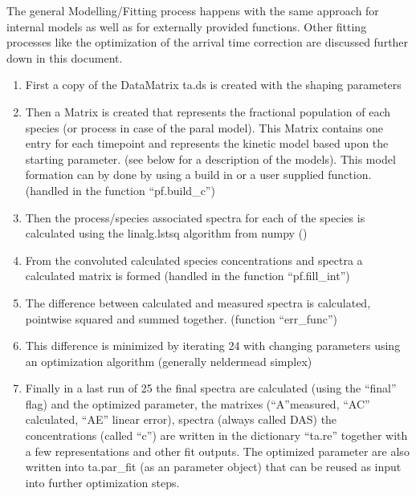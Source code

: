 \documentclass[letterpaper,10pt,english]{sphinxmanual}
\begin{document}
The general Modelling/Fitting process happens with the same approach for
internal models as well as for externally provided functions. Other
fitting processes like the optimization of the arrival time correction
are discussed further down in this document.
\begin{enumerate}
%
\item {} 
First a copy of the Data\sphinxhyphen{}Matrix ta.ds is created with the shaping
parameters

\item {} 
Then a Matrix is created that represents the fractional population of
each species (or process in case of the paral model). This Matrix
contains one entry for each timepoint and represents the kinetic
model based upon the starting parameter. (see below for a description
of the models). This model formation can by done by using a build in
or a user supplied function. (handled in the function “pf.build\_c”)

\item {} 
Then the process/species associated spectra for each of the species
is calculated using the linalg.lstsq algorithm from numpy
()

\item {} 
From the convoluted calculated species concentrations and spectra a
calculated matrix is formed (handled in the function “pf.fill\_int”)

\item {} 
The difference between calculated and measured spectra is calculated,
point\sphinxhyphen{}wise squared and summed together. (function “err\_func”)

\item {} 
This difference is minimized by iterating 2\sphinxhyphen{}4 with changing
parameters using an optimization algorithm (generally nelder\sphinxhyphen{}mead
simplex)

\item {} 
Finally in a last run of 2\sphinxhyphen{}5 the final spectra are calculated (using
the “final” flag) and the optimized parameter, the matrixes
(“A”\sphinxhyphen{}measured, “AC” \sphinxhyphen{} calculated, “AE” \sphinxhyphen{} linear error), spectra
(always called DAS) the concentrations (called “c”) are written in
the dictionary “ta.re” together with a few representations and other
fit outputs. The optimized parameter are also written into ta.par\_fit
(as an parameter object) that can be re\sphinxhyphen{}used as input into further
optimization steps.

\end{enumerate}
\end{document}
